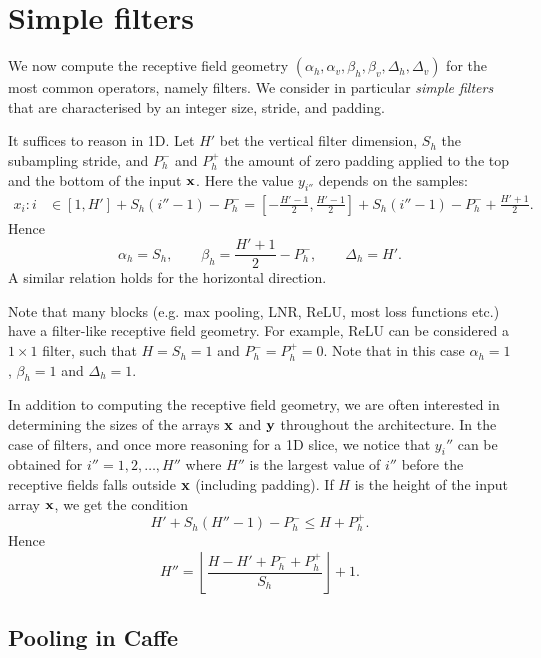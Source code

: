 \section{Simple filters}\label{s:receptive-simple-filters}

We now compute the receptive field geometry $(\alpha_h,\alpha_v,\beta_h,\beta_v,\Delta_h,\Delta_v)$ for the most common operators, namely filters. We consider in particular \emph{simple filters} that are characterised by an integer size, stride, and padding.

It suffices to reason in 1D.  Let $H'$ bet the vertical filter dimension, $S_h$ the subampling stride, and $P_h^-$ and $P_h^+$ the amount of zero padding applied to the top and the bottom of the input $\mathbf{x}$. Here the value $y_{i''}$ depends on the samples:
\begin{align*}
 x_i : i
 &\in
 [1, H'] + S_h (i'' - 1) - P_h^-
=
\left[-\frac{H'-1}{2}, \frac{H'-1}{2}\right] + S_h (i''-1) - P_h^- + \frac{H'+1}{2}.
\end{align*}
Hence
\[
\alpha_h = S_h,
\qquad
\beta _h = \frac{H'+1}{2} - P_h^-,
\qquad
\Delta_h = H'.
\]
A similar relation holds for the horizontal direction.

Note that many blocks (e.g. max pooling, LNR, ReLU, most loss functions etc.) have a filter-like receptive field geometry. For example, ReLU can be considered a $1 \times 1$ filter, such that $H = S_h=1$ and $P_h^-=P_h^+ =0$. Note that in this case $\alpha_h=1$, $\beta_h=1$ and $\Delta_h=1$.

In addition to computing the receptive field geometry, we are often interested in determining the sizes of the arrays $\mathbf{x}$ and $\mathbf{y}$ throughout the architecture. In the case of filters, and once more reasoning for a 1D slice, we notice that $y_i''$ can be obtained for $i''=1,2,\dots,H''$ where $H''$ is the largest value of $i''$ before the receptive fields falls outside $\mathbf{x}$ (including padding). If $H$ is the height of the input array $\mathbf{x}$, we get the condition
\[
   H' + S_h (H'' - 1) - P_h^- \leq H + P_h^+.
\]
Hence
\begin{equation}\label{e:filtered-height}
   H'' = \left\lfloor \frac{H - H' + P_h^- + P_h^+}{S_h} \right\rfloor + 1.	
\end{equation}

\subsection{Pooling in Caffe}

